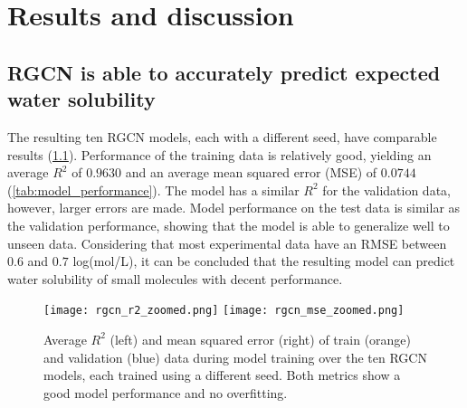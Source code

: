 \chapter{Results and discussion}

\section{RGCN is able to accurately predict expected water solubility}


The resulting ten RGCN models, each with a different seed, have comparable results 
(\cref{fig:training_history}). 
Performance of the training data is relatively good, yielding an average $R^2$ 
of $0.9630$ and an average mean squared error (MSE) of $0.0744$ (\cref{tab:model_performance}). 
The model has a similar $R^2$ for the validation data, however, larger errors are made. 
Model performance on the test data is similar as the validation performance, showing that the 
model is able to generalize well to unseen data. Considering that most experimental data have an RMSE 
between $0.6$ and $0.7$ log(mol/L),\cite{palmer2014experimental} 
it can be concluded that the resulting model can predict water solubility of small 
molecules with decent performance.



\begin{figure}[h]
    \centering
    \texttt{[image: rgcn\_r2\_zoomed.png]}
    \texttt{[image: rgcn\_mse\_zoomed.png]}
    \caption{Average $R^2$ (left) and mean squared error (right) of train (orange) and validation 
    (blue) data during model training over the ten RGCN models, each trained using a different 
    seed. Both metrics show a good model performance and no overfitting. }
    \label{fig:training_history}
\end{figure}


